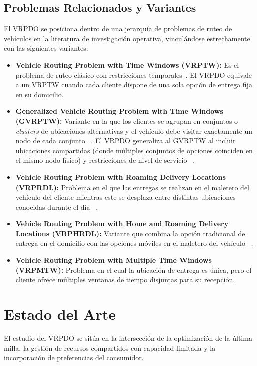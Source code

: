 \documentclass[letter, 10pt]{article}
\begin{document}
\subsection{Problemas Relacionados y Variantes} El VRPDO se posiciona dentro de una jerarquía de problemas de ruteo de vehículos en la literatura de investigación operativa, vinculándose estrechamente con las siguientes variantes: 
\begin{itemize} 
    \item \textbf{Vehicle Routing Problem with Time Windows (VRPTW):} Es el problema de ruteo clásico con restricciones temporales~\cite{Solomon87Algorithms}. El VRPDO equivale a un VRPTW cuando cada cliente dispone de una sola opción de entrega fija en su domicilio. 
    \item \textbf{Generalized Vehicle Routing Problem with Time Windows (GVRPTW):} Variante en la que los clientes se agrupan en conjuntos o \emph{clusters} de ubicaciones alternativas y el vehículo debe visitar exactamente un nodo de cada conjunto ~\cite{Moccia12Incremental}. El VRPDO generaliza al GVRPTW al incluir ubicaciones compartidas (donde múltiples conjuntos de opciones coinciden en el mismo nodo físico) y restricciones de nivel de servicio ~\cite{ Dumez21Large, Tilk21LastMile}. 
    \item \textbf{Vehicle Routing Problem with Roaming Delivery Locations (VRPRDL):} Problema en el que las entregas se realizan en el maletero del vehículo del cliente mientras este se desplaza entre distintas ubicaciones conocidas durante el día ~\cite{Ozbaygin17Branch, Reyes17Vehicle}. 
    \item \textbf{Vehicle Routing Problem with Home and Roaming Delivery Locations (VRPHRDL):} Variante que combina la opción tradicional de entrega en el domicilio con las opciones móviles en el maletero del vehículo ~\cite{Ozbaygin17Branch}. 
    \item \textbf{Vehicle Routing Problem with Multiple Time Windows (VRPMTW):} Problema en el cual la ubicación de entrega es única, pero el cliente ofrece múltiples ventanas de tiempo disjuntas para su recepción.
\end{itemize}
 


\section{Estado del Arte} 
El estudio del VRPDO se sitúa en la intersección de la optimización de la última milla, la gestión de recursos compartidos con capacidad limitada y la incorporación de preferencias del consumidor. 
\end{document}
